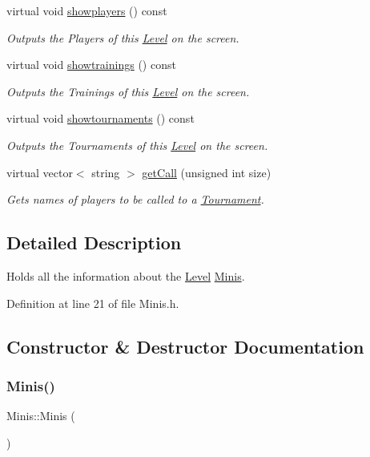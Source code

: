 \begin{DoxyCompactItemize}
virtual void \hyperlink{class_minis_a062ba8858c80dcf52c792e5304ccbfeb}{showplayers} () const
\begin{DoxyCompactList}\small\item\em Outputs the Players of this \hyperlink{class_level}{Level} on the screen. \end{DoxyCompactList}\item 
virtual void \hyperlink{class_minis_a69059ad5f89289c70ce6dec4906e02f3}{showtrainings} () const
\begin{DoxyCompactList}\small\item\em Outputs the Trainings of this \hyperlink{class_level}{Level} on the screen. \end{DoxyCompactList}\item 
virtual void \hyperlink{class_minis_a1a8d585f0c4b745c9c703cc6449c778d}{showtournaments} () const
\begin{DoxyCompactList}\small\item\em Outputs the Tournaments of this \hyperlink{class_level}{Level} on the screen. \end{DoxyCompactList}\item 
virtual vector$<$ string $>$ \hyperlink{class_minis_ad2c86c585b05e735bb6e38f672b9bbab}{get\+Call} (unsigned int size)
\begin{DoxyCompactList}\small\item\em Gets names of players to be called to a \hyperlink{class_tournament}{Tournament}. \end{DoxyCompactList}\end{DoxyCompactItemize}


\subsection{Detailed Description}
Holds all the information about the \hyperlink{class_level}{Level} \hyperlink{class_minis}{Minis}. 

Definition at line 21 of file Minis.\+h.



\subsection{Constructor \& Destructor Documentation}
\hypertarget{class_minis_a05a964e8cd328440070a970e95a69aaa}{}\label{class_minis_a05a964e8cd328440070a970e95a69aaa} 
\subsubsection{\texorpdfstring{Minis()}{Minis()}\hspace{0.1cm}{\footnotesize\ttfamily [1/2]}}
{\footnotesize\ttfamily Minis\+::\+Minis (\begin{DoxyParamCaption}{ }\end{DoxyParamCaption})\hspace{0.3cm}{\ttfamily [inline]}}



